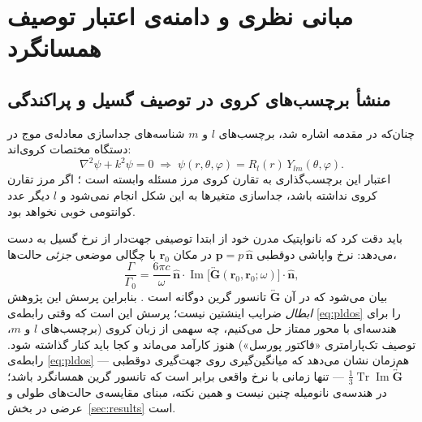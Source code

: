 \section{مبانی نظری و دامنه‌ی اعتبار توصیف همسانگرد}
\label{sec:theory}

\subsection{منشأ برچسب‌های کروی در توصیف گسیل و پراکندگی}
\label{sec:theory-origin}

چنان‌که در مقدمه اشاره شد، برچسب‌های $l$ و $m$ شناسه‌های جداسازی معادله‌ی
موج در دستگاه مختصات کروی‌اند:
%
\begin{equation}
  \nabla^2\psi + k^2\psi = 0
  \;\Longrightarrow\;
  \psi(r,\theta,\varphi) = R_l(r)\, Y_{lm}(\theta,\varphi).
  \label{eq:separation}
\end{equation}
%
اعتبار این برچسب‌گذاری به تقارن کروی مرز مسئله وابسته است
\cite{griffiths2018introduction, jackson1999classical, novotny2012principles}؛
اگر مرز تقارن کروی نداشته باشد، جداسازی متغیرها به این شکل انجام نمی‌شود و
$l$ دیگر عدد کوانتومی خوبی نخواهد بود.

باید دقت کرد که نانواپتیک مدرن خود از ابتدا توصیفی جهت‌دار از نرخ گسیل
به دست می‌دهد: نرخ واپاشی دوقطبی $\mathbf{p} = p\,\hat{\mathbf{n}}$ در
مکان $\mathbf{r}_0$ با چگالی موضعی \emph{جزئی} حالت‌ها،
%
\begin{equation}
  \frac{\Gamma}{\Gamma_0}
  = \frac{6\pi c}{\omega}\,
    \hat{\mathbf{n}}\cdot\operatorname{Im}\!\big[\overleftrightarrow{\mathbf{G}}(\mathbf{r}_0,\mathbf{r}_0;\omega)\big]\cdot\hat{\mathbf{n}},
  \label{eq:pldos}
\end{equation}
%
بیان می‌شود که در آن $\overleftrightarrow{\mathbf{G}}$ تانسور گرین دوگانه
است \cite[ch.~8]{novotny2012principles}. بنابراین پرسش این پژوهش
\emph{ابطال} ضرایب اینشتین نیست؛ پرسش این است که وقتی رابطه‌ی
\eqref{eq:pldos} را برای هندسه‌ای با محور ممتاز حل می‌کنیم، چه سهمی از
زبان کروی (برچسب‌های $l$ و $m$، توصیف تک‌پارامتری «فاکتور پورسل») هنوز
کارآمد می‌ماند و کجا باید کنار گذاشته شود. رابطه‌ی \eqref{eq:pldos}
هم‌زمان نشان می‌دهد که میانگین‌گیری روی جهت‌گیری دوقطبی —
$\tfrac{1}{3}\operatorname{Tr}\operatorname{Im}\overleftrightarrow{\mathbf{G}}$ —
تنها زمانی با نرخ واقعی برابر است که تانسور گرین همسانگرد باشد؛ در
هندسه‌ی نانومیله چنین نیست و همین نکته، مبنای مقایسه‌ی حالت‌های طولی و
عرضی در بخش~\ref{sec:results} است.

